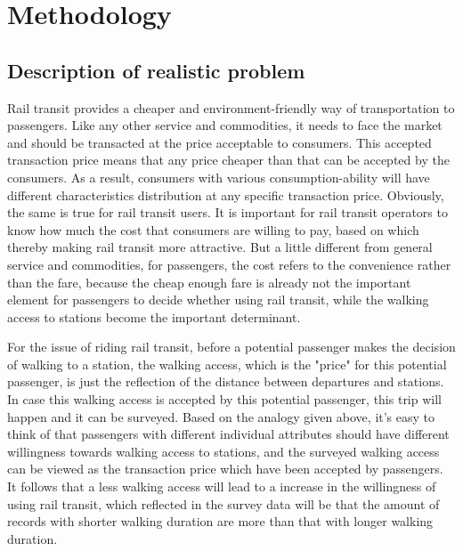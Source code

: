 %
\section{Methodology}

\subsection{Description of realistic problem}
Rail transit provides a cheaper and environment-friendly way of transportation to passengers. Like any other service and commodities, it needs to face the market and should be transacted at the price acceptable to consumers. This accepted transaction price means that any price cheaper than that can be accepted by the consumers. As a result, consumers with various consumption-ability will have different characteristics distribution at any specific transaction price. Obviously, the same is true for rail transit users. It is important for rail transit operators to know how much the cost that consumers are willing to pay, based on which thereby making rail transit more attractive. But a little different from general service and commodities, for passengers, the cost refers to the convenience rather than the fare, because the cheap enough fare is already not the important element for passengers to decide whether using rail transit, while the walking access to stations become the important determinant.

For the issue of riding rail transit, before a potential passenger makes the decision of walking to a station, the walking access, which is the "price" for this potential passenger, is just the reflection of the distance between departures and stations. In case this walking access is accepted by this potential passenger, this trip will happen and it can be surveyed. Based on the analogy given above, it's easy to think of that passengers with different individual attributes should have different willingness towards walking access to stations, and the surveyed walking access can be viewed as the transaction price which have been accepted by passengers. It follows that a less walking access will lead to a increase in the willingness of using rail transit, which reflected in the survey data will be that the amount of records with shorter walking duration are more than that with longer walking duration. 

